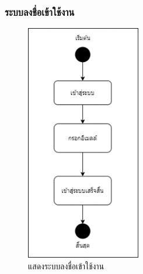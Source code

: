 \documentclass[12pt,oneside,openright,a4paper]{cpe-thai-project}
\begin{document}
\subsubsection{ระบบลงชื่อเข้าใช้งาน}

\begin{figure}[!h]
  \centering
  \includegraphics[width=5cm]{./image/ad-login.png}
  \caption{แสดงระบบลงชื่อเข้าใช้งาน}
  \label{fig:ad-login}
\end{figure}
\end{document}
